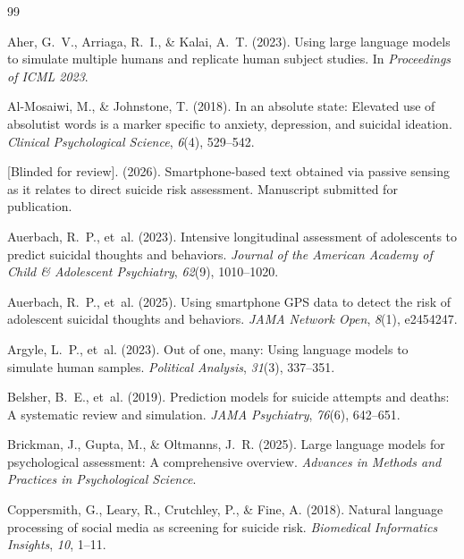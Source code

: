 \documentclass[review,12pt,authoryear]{elsarticle}
\begin{document}
\begin{thebibliography}{99}

Aher, G.~V., Arriaga, R.~I., \& Kalai, A.~T. (2023).
\newblock Using large language models to simulate multiple humans and replicate human subject studies.
\newblock In \textit{Proceedings of ICML 2023}.

Al-Mosaiwi, M., \& Johnstone, T. (2018).
\newblock In an absolute state: {E}levated use of absolutist words is a marker specific to anxiety, depression, and suicidal ideation.
\newblock \textit{Clinical Psychological Science}, \textit{6}(4), 529--542.

[Blinded for review]. (2026).
\newblock Smartphone-based text obtained via passive sensing as it relates to direct suicide risk assessment.
\newblock Manuscript submitted for publication.

Auerbach, R.~P., et~al. (2023).
\newblock Intensive longitudinal assessment of adolescents to predict suicidal thoughts and behaviors.
\newblock \textit{Journal of the American Academy of Child \& Adolescent Psychiatry}, \textit{62}(9), 1010--1020.

Auerbach, R.~P., et~al. (2025).
\newblock Using smartphone {GPS} data to detect the risk of adolescent suicidal thoughts and behaviors.
\newblock \textit{JAMA Network Open}, \textit{8}(1), e2454247.

Argyle, L.~P., et~al. (2023).
\newblock Out of one, many: {U}sing language models to simulate human samples.
\newblock \textit{Political Analysis}, \textit{31}(3), 337--351.

Belsher, B.~E., et~al. (2019).
\newblock Prediction models for suicide attempts and deaths: {A} systematic review and simulation.
\newblock \textit{JAMA Psychiatry}, \textit{76}(6), 642--651.

Brickman, J., Gupta, M., \& Oltmanns, J.~R. (2025).
\newblock Large language models for psychological assessment: {A} comprehensive overview.
\newblock \textit{Advances in Methods and Practices in Psychological Science}.

Coppersmith, G., Leary, R., Crutchley, P., \& Fine, A. (2018).
\newblock Natural language processing of social media as screening for suicide risk.
\newblock \textit{Biomedical Informatics Insights}, \textit{10}, 1--11.


\end{thebibliography}
\end{document}
